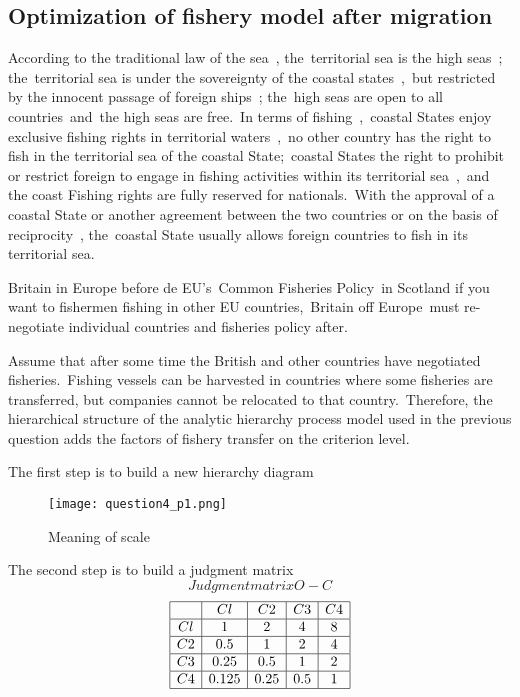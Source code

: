 \documentclass{mcmthesis}
\begin{document}
\subsection{Optimization of fishery model after migration}
According to the traditional law of the sea , the territorial sea is the high seas ; the territorial sea is under the sovereignty of the coastal states , but restricted by the innocent passage of foreign ships ; the high seas are open to all countries and the high seas are free. In terms of fishing , coastal States enjoy exclusive fishing rights in territorial waters , no other country has the right to fish in the territorial sea of the coastal State; coastal States the right to prohibit or restrict foreign to engage in fishing activities within its territorial sea , and the coast Fishing rights are fully reserved for nationals. With the approval of a coastal State or another agreement between the two countries or on the basis of reciprocity , the coastal State usually allows foreign countries to fish in its territorial sea. 

Britain in Europe before de EU's Common Fisheries Policy in Scotland if you want to fishermen fishing in other EU countries, Britain off Europe must re-negotiate individual countries and fisheries policy after.

Assume that after some time the British and other countries have negotiated fisheries. Fishing vessels can be harvested in countries where some fisheries are transferred, but companies cannot be relocated to that country. Therefore, the hierarchical structure of the analytic hierarchy process model used in the previous question adds the factors of fishery transfer on the criterion level.

The first step is to build a new hierarchy diagram

\begin{figure}[!htp]
	\centering
	\texttt{[image: question4\_p1.png]}\\
	\caption{Meaning of scale}
\end{figure}

The second step is to build a judgment matrix
$$Judgment matrix O-C$$
$$
\begin{array}{|c|c|c|c|c|}
\hline  & {{Cl}} & {{C} 2} & {{C} 3} & {{C} 4} \\
\hline {Cl} & {1} & {2} & {4} & {8} \\
\hline {C2} & {0.5} & {1} & {2} & {4} \\
\hline {C3} & {0.25} & {0.5} & {1} & {2} \\
\hline {C4} & {0.125} & {0.25} & {0.5} & {1} \\
\hline
\end{array}
$$
\end{document}
